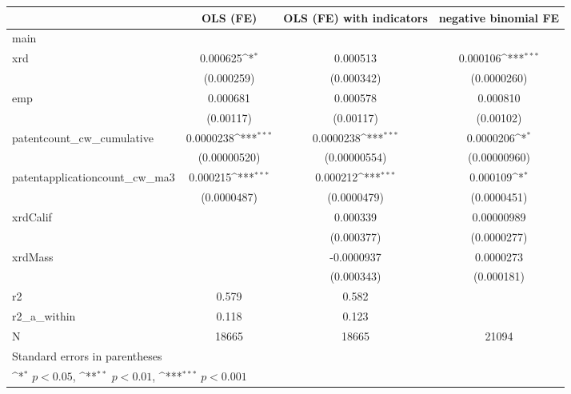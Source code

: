 {
\def\sym#1{\ifmmode^{#1}\else\(^{#1}\)\fi}
\begin{tabular}{l*{3}{c}}
\hline\hline
            &\multicolumn{1}{c}{OLS (FE)}&\multicolumn{1}{c}{OLS (FE) with indicators}&\multicolumn{1}{c}{negative binomial FE}\\
\hline
main        &                     &                     &                     \\
xrd         &    0.000625\sym{*}  &    0.000513         &    0.000106\sym{***}\\
            &  (0.000259)         &  (0.000342)         & (0.0000260)         \\
[1em]
emp         &    0.000681         &    0.000578         &    0.000810         \\
            &   (0.00117)         &   (0.00117)         &   (0.00102)         \\
[1em]
patentcount\_cw\_cumulative&   0.0000238\sym{***}&   0.0000238\sym{***}&   0.0000206\sym{*}  \\
            &(0.00000520)         &(0.00000554)         &(0.00000960)         \\
[1em]
patentapplicationcount\_cw\_ma3&    0.000215\sym{***}&    0.000212\sym{***}&    0.000109\sym{*}  \\
            & (0.0000487)         & (0.0000479)         & (0.0000451)         \\
[1em]
xrdCalif    &                     &    0.000339         &  0.00000989         \\
            &                     &  (0.000377)         & (0.0000277)         \\
[1em]
xrdMass     &                     &  -0.0000937         &   0.0000273         \\
            &                     &  (0.000343)         &  (0.000181)         \\
\hline
r2          &       0.579         &       0.582         &                     \\
r2\_a\_within &       0.118         &       0.123         &                     \\
N           &       18665         &       18665         &       21094         \\
\hline\hline
\multicolumn{4}{l}{\footnotesize Standard errors in parentheses}\\
\multicolumn{4}{l}{\footnotesize \sym{*} \(p<0.05\), \sym{**} \(p<0.01\), \sym{***} \(p<0.001\)}\\
\end{tabular}
}
